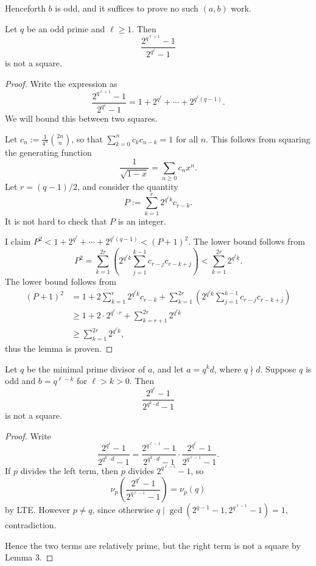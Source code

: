 Henceforth $b$ is odd, and it suffices to prove no such $(a,b)$ work.
\begin{boxlemma}[Problem for $a=q^\ell$, $b=q$]
    Let $q$ be an odd prime and $\ell\ge1$. Then \[\frac{2^{q^{\ell+1}}-1}{2^{q^\ell}-1}\]
    is not a square.
\end{boxlemma}
\begin{proof}
    Write the expression as \[\frac{2^{q^{\ell+1}}-1}{2^{q^\ell}-1}=1+2^{q^\ell}+\cdots+2^{q^\ell(q-1)}.\]
    We will bound this between two squares.

    Let $c_n:=\frac1{4^n}\binom{2n}n$, so that $\sum_{k=0}^nc_kc_{n-k}=1$ for all $n$. This follows from squaring the generating function \[\frac1{\sqrt{1-x}}=\sum_{n\ge0}c_nx^n.\]
    Let $r=(q-1)/2$, and consider the quantity \[P:=\sum_{k=1}^r2^{q^\ell k}c_{r-k}.\]
    It is not hard to check that $P$ is an integer.

    I claim $P^2<1+2^{q^\ell}+\cdots+2^{q^\ell(q-1)}<(P+1)^2$. The lower bound follows from \[P^2=\sum_{k=1}^{2r}\left(2^{q^{\ell}k}\sum_{j=1}^{k-1}c_{r-j}c_{r-k+j}\right)<\sum_{k=1}^{2r}2^{q^\ell k}.\]
    The lower bound follows from
    \begin{align*}
        (P+1)^2&=1+2\sum_{k=1}^r2^{q^\ell k}c_{r-k}+\sum_{k=1}^{2r}\left(2^{q^{\ell}k}\sum_{j=1}^{k-1}c_{r-j}c_{r-k+j}\right)\\
        &\ge1+2\cdot2^{q^\ell\cdot r}+\sum_{k=r+1}^{2r}2^{q^\ell k}\\
        &\ge\sum_{k=1}^{2r}2^{q^\ell k},
    \end{align*}
    thus the lemma is proven.
\end{proof}
\begin{boxlemma}[Problem for $a=q^kd$, $b=q^\ell$]
    Let $q$ be the minimal prime divisor of $a$, and let $a=q^kd$, where $q\nmid d$. Suppose $q$ is odd and $b=q^{\ell-k}$ for $\ell>k>0$. Then \[\frac{2^{q^{\ell}}-1}{2^{q^k\cdot d}-1}\]
    is not a square.
\end{boxlemma}
\begin{proof}
    Write \[\frac{2^{q^{\ell}}-1}{2^{q^k\cdot d}-1}=\frac{2^{q^{\ell-1}}-1}{2^{q^k\cdot d}-1}\cdot\frac{2^{q^{\ell}}-1}{2^{q^{\ell-1}}-1}.\]
    If $p$ divides the left term, then $p$ divides $2^{q^{\ell-1}}-1$, so \[\nu_p\left(\frac{2^{q^\ell}-1}{2^{q^{\ell-1}}-1}\right)=\nu_p(q)\]
    by LTE. However $p\ne q$, since otherwise $q\mid\gcd\left(2^{q-1}-1,2^{q^{\ell-1}}-1\right)=1$, contradiction.

    Hence the two terms are relatively prime, but the right term is not a square by Lemma 3.
\end{proof}
